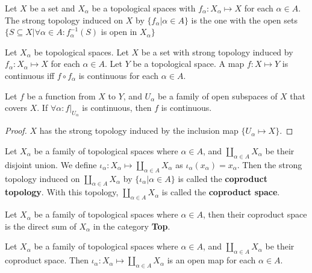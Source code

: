 \documentclass[12pt]{book}
\begin{document}
\begin{theorem}
	Let $X$ be a set and $X_\alpha$ be a topological spaces with $f_\alpha:X_\alpha \mapsto X$ for each $\alpha\in A$. The strong topology induced on $X$ by $\{f_\alpha|\alpha\in A\}$ is the one with the open sets $\{S\subseteq X|\forall \alpha\in A:f^{-1}_\alpha(S)$ is open in $X_\alpha\}$
\end{theorem}

\begin{theorem}
	Let $X_\alpha$ be topological spaces. Let $X$ be a set with strong topology induced by $f_\alpha:X_\alpha\mapsto X$ for each $\alpha\in A$. Let $Y$ be a topological space. A map $f:X\mapsto Y$ is continuous iff $f\circ f_\alpha$ is continuous for each $\alpha \in A$.
\end{theorem}


\begin{corollary}
	Let $f$ be a function from $X$ to $Y$, and $U_\alpha$ be a family of open subspaces of $X$ that covers $X$. If $\forall \alpha:f|_{U_\alpha}$ is continuous, then $f$ is continuous.
\end{corollary}
\begin{proof}
	$X$ has the strong topology induced by the inclusion map $\{U_\alpha\mapsto X\}$.
\end{proof}

\begin{definition}
	Let $X_\alpha$ be a family of topological spaces where $\alpha\in A$, and $\coprod_{\alpha\in A}X_\alpha$ be their disjoint union. We define $\iota_\alpha:X_\alpha\mapsto \coprod_{\alpha\in A}X_\alpha $ as $\iota_\alpha(x_\alpha)=x_\alpha$. Then the strong topology induced on $\coprod_{\alpha\in A}X_\alpha$ by  $\{\iota_\alpha|\alpha\in A\}$ is called the {\bf coproduct topology}. With this topology, $\coprod_{\alpha\in A}X_\alpha$ is called the {\bf coproduct space}.
\end{definition}

\begin{theorem}
	Let $X_\alpha$ be a family of topological spaces where $\alpha\in A$, then their coproduct space is the direct sum of $X_\alpha$ in the category {\bf Top}.
\end{theorem}

\begin{theorem}
	Let $X_\alpha$ be a family of topological spaces where $\alpha\in A$, and $\coprod_{\alpha\in A}X_\alpha$ be their coproduct space. Then $\iota_\alpha: X_\alpha\mapsto\coprod_{\alpha\in A}X_\alpha$ is an open map for each $\alpha \in A$.
\end{theorem}
\end{document}
